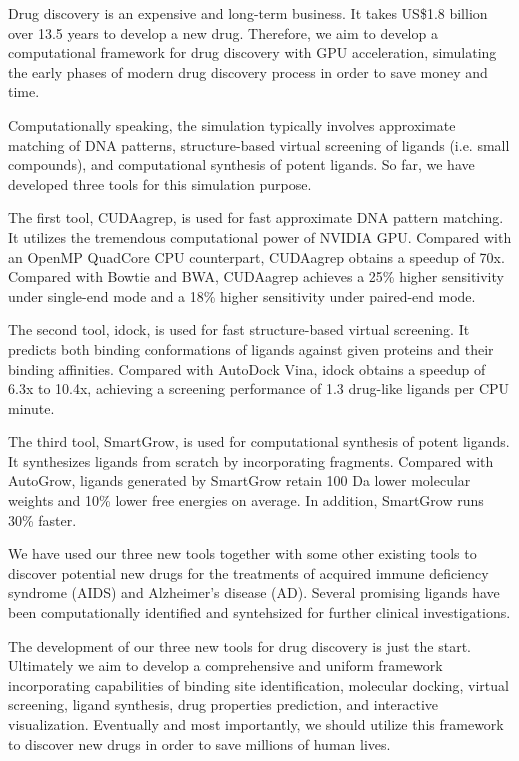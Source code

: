 Drug discovery is an expensive and long-term business. It takes US\$1.8 billion over 13.5 years to develop a new drug. Therefore, we aim to develop a computational framework for drug discovery with GPU acceleration, simulating the early phases of modern drug discovery process in order to save money and time.

Computationally speaking, the simulation typically involves approximate matching of DNA patterns, structure-based virtual screening of ligands (i.e. small compounds), and computational synthesis of potent ligands. So far, we have developed three tools for this simulation purpose.

The first tool, CUDAagrep, is used for fast approximate DNA pattern matching. It utilizes the tremendous computational power of NVIDIA GPU. Compared with an OpenMP QuadCore CPU counterpart, CUDAagrep obtains a speedup of 70x. Compared with Bowtie and BWA, CUDAagrep achieves a 25\% higher sensitivity under single-end mode and a 18\% higher sensitivity under paired-end mode.

The second tool, idock, is used for fast structure-based virtual screening. It predicts both binding conformations of ligands against given proteins and their binding affinities. Compared with AutoDock Vina, idock obtains a speedup of 6.3x to 10.4x, achieving a screening performance of 1.3 drug-like ligands per CPU minute.

The third tool, SmartGrow, is used for computational synthesis of potent ligands. It synthesizes ligands from scratch by incorporating fragments. Compared with AutoGrow, ligands generated by SmartGrow retain 100 Da lower molecular weights and 10\% lower free energies on average. In addition, SmartGrow runs 30\% faster.

We have used our three new tools together with some other existing tools to discover potential new drugs for the treatments of acquired immune deficiency syndrome (AIDS) and Alzheimer's disease (AD). Several promising ligands have been computationally identified and syntehsized for further clinical investigations.

The development of our three new tools for drug discovery is just the start. Ultimately we aim to develop a comprehensive and uniform framework incorporating capabilities of binding site identification, molecular docking, virtual screening, ligand synthesis, drug properties prediction, and interactive visualization. Eventually and most importantly, we should utilize this framework to discover new drugs in order to save millions of human lives.
